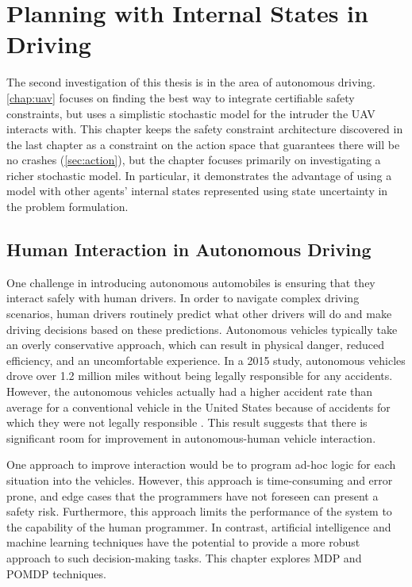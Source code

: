 \chapter{Planning with Internal States in Driving} \label{chap:multilane}

The second investigation of this thesis is in the area of autonomous driving.
\cref{chap:uav} focuses on finding the best way to integrate certifiable safety constraints, but uses a simplistic stochastic model for the intruder the UAV interacts with.
This chapter keeps the safety constraint architecture discovered in the last chapter as a constraint on the action space that guarantees there will be no crashes (\cref{sec:action}), but the chapter focuses primarily on investigating a richer stochastic model.
In particular, it demonstrates the advantage of using a model with other agents' internal states represented using state uncertainty in the problem formulation.

\section{Human Interaction in Autonomous Driving}

One challenge in introducing autonomous automobiles is ensuring that they interact safely with human drivers.
In order to navigate complex driving scenarios, human drivers routinely predict what other drivers will do and make driving decisions based on these predictions.
Autonomous vehicles typically take an overly conservative approach, which can result in physical danger, reduced efficiency, and an uncomfortable experience. %
In a 2015 study, autonomous vehicles drove over 1.2 million miles without being legally responsible for any accidents.
However, the autonomous vehicles actually had a higher accident rate than average for a conventional vehicle in the United States because of accidents for which they were not legally responsible \cite{schoettle2015crashes}.
This result suggests that there is significant room for improvement in autonomous-human vehicle interaction.  

One approach to improve interaction would be to program ad-hoc logic for each situation into the vehicles.
However, this approach is time-consuming and error prone, and edge cases that the programmers have not foreseen can present a safety risk.
Furthermore, this approach limits the performance of the system to the capability of the human programmer.
In contrast, artificial intelligence and machine learning techniques have the potential to provide a more robust approach to such decision-making tasks.
This chapter explores MDP and POMDP techniques.

